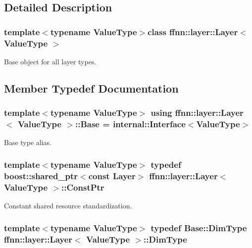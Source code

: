 \subsection{Detailed Description}
\subsubsection*{template$<$typename Value\-Type$>$class ffnn\-::layer\-::\-Layer$<$ Value\-Type $>$}

Base object for all layer types. 

\subsection{Member Typedef Documentation}
\hypertarget{classffnn_1_1layer_1_1_layer_a54b8c1b013fe141fbfc7f4dc63ab6882}{
\subsubsection[{Base}]{\setlength{\rightskip}{0pt plus 5cm}template$<$typename Value\-Type$>$ using {\bf ffnn\-::layer\-::\-Layer}$<$ Value\-Type $>$\-::{\bf Base} =  {\bf internal\-::\-Interface}$<$Value\-Type$>$}}\label{classffnn_1_1layer_1_1_layer_a54b8c1b013fe141fbfc7f4dc63ab6882}


Base type alias. 

\hypertarget{classffnn_1_1layer_1_1_layer_aa1b22cc70a5ae0101cae5a9825043fbc}{
\subsubsection[{Const\-Ptr}]{\setlength{\rightskip}{0pt plus 5cm}template$<$typename Value\-Type$>$ typedef boost\-::shared\-\_\-ptr$<$const {\bf Layer}$>$ {\bf ffnn\-::layer\-::\-Layer}$<$ Value\-Type $>$\-::{\bf Const\-Ptr}}}\label{classffnn_1_1layer_1_1_layer_aa1b22cc70a5ae0101cae5a9825043fbc}


Constant shared resource standardization. 

\hypertarget{classffnn_1_1layer_1_1_layer_a104a0f51427df4e03f4ac9e1ce7f6083}{
\subsubsection[{Dim\-Type}]{\setlength{\rightskip}{0pt plus 5cm}template$<$typename Value\-Type$>$ typedef {\bf Base\-::\-Dim\-Type} {\bf ffnn\-::layer\-::\-Layer}$<$ Value\-Type $>$\-::{\bf Dim\-Type}}}\label{classffnn_1_1layer_1_1_layer_a104a0f51427df4e03f4ac9e1ce7f6083}


